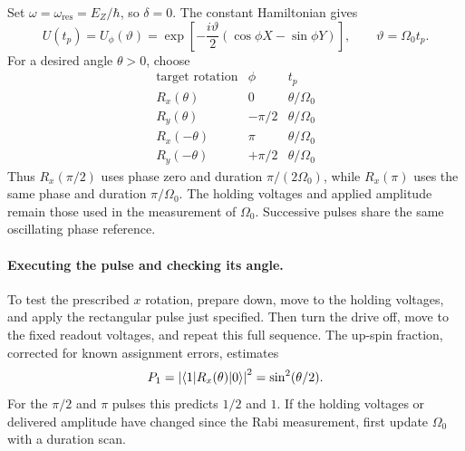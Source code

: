 Set $\omega=\omega_{\mathrm{res}}=E_Z/\hbar$, so $\delta=0$.
The constant Hamiltonian gives
\[
 U(t_p)=U_\phi(\vartheta)
 =\exp\!\left[-\frac{i\vartheta}{2}
                   (\cos\phi X-\sin\phi Y)\right],
 \qquad \vartheta=\Omega_0t_p.
\]
For a desired angle $\theta>0$, choose
\[
 \begin{array}{c|c|c}
 \text{target rotation}&\phi&t_p\\ \hline
 R_x(\theta)&0&\theta/\Omega_0\\
 R_y(\theta)&-\pi/2&\theta/\Omega_0\\
 R_x(-\theta)&\pi&\theta/\Omega_0\\
 R_y(-\theta)&+\pi/2&\theta/\Omega_0
 \end{array}
\]
Thus $R_x(\pi/2)$ uses phase zero and duration $\pi/(2\Omega_0)$,
while $R_x(\pi)$ uses the same phase and duration $\pi/\Omega_0$.
The holding voltages and applied amplitude remain those used in the
measurement of $\Omega_0$. Successive pulses share the same
oscillating phase reference.

\paragraph{Executing the pulse and checking its angle.}
To test the prescribed $x$ rotation, prepare down, move to the
holding voltages, and apply the rectangular pulse just specified.
Then turn the drive off, move to the fixed readout voltages, and
repeat this full sequence. The up-spin fraction, corrected for
known assignment errors, estimates
\[
 P_1=\left|\langle 1\rvert R_x(\theta)\lvert 0\rangle\right|^2
    =\sin^2(\theta/2).
\]
For the $\pi/2$ and $\pi$ pulses this predicts $1/2$ and $1$.
If the holding voltages or delivered amplitude have changed since
the Rabi measurement, first update $\Omega_0$ with a duration scan.

